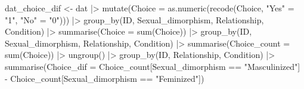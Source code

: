 \documentclass[
  bookmarksnumbered]{article}
\newenvironment{Shaded}{\begin{snugshade}}{\end{snugshade}}
\newcommand{\AttributeTok}[1]{\textcolor[rgb]{0.80,0.80,0.80}{#1}}
\newcommand{\FunctionTok}[1]{\textcolor[rgb]{0.94,0.94,0.56}{#1}}
\newcommand{\NormalTok}[1]{\textcolor[rgb]{0.80,0.80,0.80}{#1}}
\newcommand{\OtherTok}[1]{\textcolor[rgb]{0.94,0.94,0.56}{#1}}
\newcommand{\SpecialCharTok}[1]{\textcolor[rgb]{0.86,0.64,0.64}{#1}}
\newcommand{\StringTok}[1]{\textcolor[rgb]{0.80,0.58,0.58}{#1}}
\begin{document}
\begin{Shaded}
\begin{Highlighting}[]
\NormalTok{dat\_choice\_dif }\OtherTok{\textless{}{-}}\NormalTok{ dat }\SpecialCharTok{|\textgreater{}} 
  \FunctionTok{mutate}\NormalTok{(}\AttributeTok{Choice =} \FunctionTok{as.numeric}\NormalTok{(}\FunctionTok{recode}\NormalTok{(Choice,}
                                    \StringTok{"Yes"} \OtherTok{=}  \StringTok{"1"}\NormalTok{,}
                                    \StringTok{"No"} \OtherTok{=} \StringTok{"0"}\NormalTok{))) }\SpecialCharTok{|\textgreater{}} 
  \FunctionTok{group\_by}\NormalTok{(ID, Sexual\_dimorphism, Relationship, Condition) }\SpecialCharTok{|\textgreater{}} 
  \FunctionTok{summarise}\NormalTok{(}\AttributeTok{Choice =} \FunctionTok{sum}\NormalTok{(Choice)) }\SpecialCharTok{|\textgreater{}} 
  \FunctionTok{group\_by}\NormalTok{(ID, Sexual\_dimorphism, Relationship, Condition) }\SpecialCharTok{|\textgreater{}} 
  \FunctionTok{summarise}\NormalTok{(}\AttributeTok{Choice\_count =} \FunctionTok{sum}\NormalTok{(Choice)) }\SpecialCharTok{|\textgreater{}} 
  \FunctionTok{ungroup}\NormalTok{() }\SpecialCharTok{|\textgreater{}} 
  \FunctionTok{group\_by}\NormalTok{(ID, Relationship, Condition) }\SpecialCharTok{|\textgreater{}} 
  \FunctionTok{summarise}\NormalTok{(}\AttributeTok{Choice\_dif =}\NormalTok{ Choice\_count[Sexual\_dimorphism }\SpecialCharTok{==} \StringTok{"Masculinized"}\NormalTok{] }\SpecialCharTok{{-}} 
\NormalTok{              Choice\_count[Sexual\_dimorphism }\SpecialCharTok{==} \StringTok{"Feminized"}\NormalTok{])}


\end{Highlighting}
\end{Shaded}
\end{document}
